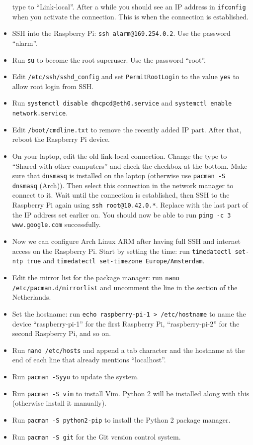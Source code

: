 \documentclass{article}
\newcommand{\arch}{{\color{red} (Arch)}}
\begin{document}
\begin{itemize}
          type to ``Link-local''. After a while you should see an IP address in 
          {\tt ifconfig} when you activate the connection. This is when the 
          connection is established.
    \item SSH into the Raspberry Pi: {\tt ssh alarm@169.254.0.2}. Use the 
          password ``alarm''.
    \item Run {\tt su} to become the root superuser. Use the password ``root''.
    \item Edit {\tt /etc/ssh/sshd\_config} and set {\tt PermitRootLogin} to the 
          value {\tt yes} to allow root login from SSH.
    \item Run {\tt systemctl disable dhcpcd@eth0.service} and {\tt systemctl 
          enable network.service}.
    \item Edit {\tt /boot/cmdline.txt} to remove the recently added IP part. 
          After that, reboot the Raspberry Pi device.
    \item On your laptop, edit the old link-local connection. Change the type 
          to ``Shared with other computers'' and check the checkbox at the 
          bottom. Make sure that {\tt dnsmasq} is installed on the laptop 
          (otherwise use {\tt pacman -S dnsmasq} \arch{}). Then select this 
          connection in the network manager to connect to it. Wait until the 
          connection is established, then SSH to the Raspberry Pi again using 
          {\tt ssh root@10.42.0.*}. Replace {\tt *} with the last part of the 
          IP address set earlier on. You should now be able to run {\tt ping -c 
          3 www.google.com} successfully.
    \item Now we can configure Arch Linux ARM after having full SSH and 
          internet access on the Raspberry Pi. Start by setting the time: run 
          {\tt timedatectl set-ntp true} and {\tt timedatectl set-timezone 
          Europe/Amsterdam}.
    \item Edit the mirror list for the package manager: run {\tt nano 
          /etc/pacman.d/mirrorlist} and uncomment the line in the section of 
          the Netherlands.
    \item Set the hostname: run {\tt echo raspberry-pi-1 > /etc/hostname} to 
          name the device ``raspberry-pi-1'' for the first Raspberry Pi, 
          ``raspberry-pi-2'' for the second Raspberry Pi, and so on.
    \item Run {\tt nano /etc/hosts} and append a tab character and the hostname 
          at the end of each line that already mentions ``localhost''.
    \item Run {\tt pacman -Syyu} to update the system.
    \item Run {\tt pacman -S vim} to install Vim. Python 2 will be installed 
          along with this (otherwise install it manually).
    \item Run {\tt pacman -S python2-pip} to install the Python 2 package 
          manager.
    \item Run {\tt pacman -S git} for the Git version control system.
\end{itemize}
\end{document}
